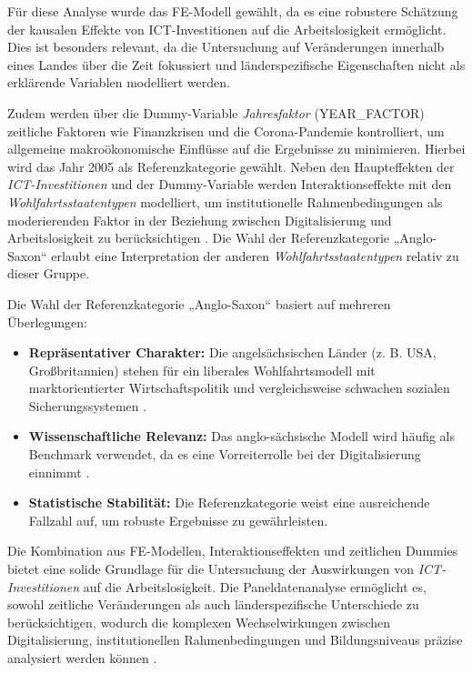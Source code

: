 Für diese Analyse wurde das \ac{FE}-Modell gewählt, da es eine robustere Schätzung 
der kausalen Effekte von ICT-Investitionen auf die Arbeitslosigkeit ermöglicht. Dies ist 
besonders relevant, da die Untersuchung auf Veränderungen innerhalb eines Landes über die Zeit 
fokussiert und länderspezifische Eigenschaften nicht als erklärende Variablen modelliert werden.

Zudem werden über die Dummy-Variable \textit{Jahresfaktor} (YEAR\_FACTOR) zeitliche 
Faktoren wie Finanzkrisen und die Corona-Pandemie kontrolliert, um allgemeine makroökonomische 
Einflüsse auf die Ergebnisse zu minimieren. Hierbei wird das Jahr 2005 als Referenzkategorie 
gewählt. Neben den Haupteffekten der \textit{\ac{ICT}-Investitionen} und der Dummy-Variable 
werden Interaktionseffekte mit den \textit{Wohlfahrtsstaatentypen} modelliert, um 
institutionelle Rahmenbedingungen als moderierenden Faktor in der Beziehung zwischen 
Digitalisierung und Arbeitslosigkeit zu berücksichtigen \parencite{espingandersen1990thethree}. 
Die Wahl der Referenzkategorie „Anglo-Saxon“ erlaubt eine Interpretation der anderen 
\textit{Wohlfahrtsstaatentypen} relativ zu dieser Gruppe. 

Die Wahl der Referenzkategorie „Anglo-Saxon“ basiert auf mehreren Überlegungen:

\begin{itemize}
    \item \textbf{Repräsentativer Charakter:} Die angelsächsischen Länder (z. B. USA, 
    Großbritannien) stehen für ein liberales Wohlfahrtsmodell mit 
    marktorientierter Wirtschaftspolitik und vergleichsweise schwachen sozialen 
    Sicherungssystemen \parencite[S. 15–50]{brynjolfsson2015thesecond}.

    \item \textbf{Wissenschaftliche Relevanz:} Das anglo-sächsische Modell wird häufig als 
    Benchmark verwendet, da es eine Vorreiterrolle bei der Digitalisierung einnimmt 
    \parencite[Kap. 2]{brynjolfsson2015thesecond}.

    \item \textbf{Statistische Stabilität:} Die Referenzkategorie weist eine ausreichende 
    Fallzahl auf, um robuste Ergebnisse zu gewährleisten.
\end{itemize}

Die Kombination aus \ac{FE}-Modellen, Interaktionseffekten und 
zeitlichen Dummies bietet eine solide Grundlage für die Untersuchung der 
Auswirkungen von \textit{\ac{ICT}-Investitionen} auf die Arbeitslosigkeit. Die 
Paneldatenanalyse ermöglicht es, sowohl zeitliche Veränderungen als auch 
länderspezifische Unterschiede zu berücksichtigen, wodurch die komplexen Wechselwirkungen 
zwischen Digitalisierung, institutionellen Rahmenbedingungen und Bildungsniveaus präzise 
analysiert werden können \parencite[S. 12–15]{baltagi2021econometric}.
